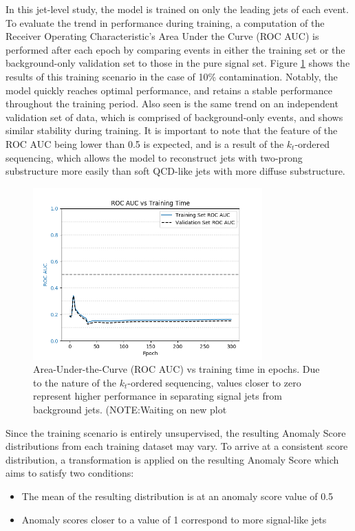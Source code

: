 \documentclass[12pt, a4paper]{article}
\begin{document}

In this jet-level study, the model is trained on only the leading jets of each event. To evaluate the trend in performance during training, a computation of the Receiver Operating Characteristic's Area Under the Curve (ROC AUC) is performed after each epoch by comparing events in either the training set or the background-only validation set to those in the pure signal set. Figure \ref{fig:auc_vs_epoch} shows the results of this training scenario in the case of 10\% contamination. Notably, the model quickly reaches optimal performance, and retains a stable performance throughout the training period. Also seen is the same trend on an independent validation set of data, which is comprised of background-only events, and shows similar stability during training. It is important to note that the feature of the ROC AUC being lower than 0.5 is expected, and is a result of the $k_{t}$-ordered sequencing, which allows the model to reconstruct jets with two-prong substructure more easily than soft QCD-like jets with more diffuse substructure.

\begin{figure}[H]
	\begin{center}
		\includegraphics[width=250pt]{imgs/auc_vs_epoch.png}
	\end{center}
	\caption{Area-Under-the-Curve (ROC AUC) vs training time in epochs. Due to the nature of the $k_{t}$-ordered sequencing, values closer to zero represent higher performance in separating signal jets from background jets. (NOTE:Waiting on new plot}
	\label{fig:auc_vs_epoch}
\end{figure}

Since the training scenario is entirely unsupervised, the resulting Anomaly Score distributions from each training dataset may vary. To arrive at a consistent score distribution, a transformation is applied on the resulting Anomaly Score which aims to satisfy two conditions:
\begin{itemize}
	\item{The mean of the resulting distribution is at an anomaly score value of 0.5}
	\item{Anomaly scores closer to a value of 1 correspond to more signal-like jets}
\end{itemize}
\end{document}
